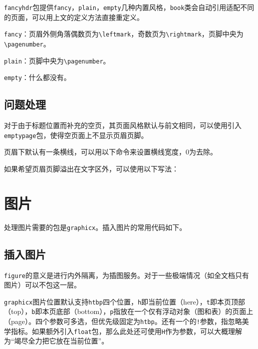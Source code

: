 \documentclass[10pt,openany]{book}
\begin{document}
\texttt{fancyhdr}包提供\texttt{fancy}，\texttt{plain}，\texttt{empty}几种内置风格，\texttt{book}类会自动引用适配不同的页面，可以用上文的定义方法直接重定义。

\texttt{fancy}：页眉外侧角落偶数页为\texttt{\textbackslash{}leftmark}，奇数页为\texttt{\textbackslash{}rightmark}，页脚中央为\texttt{\textbackslash{}pagenumber}。

\texttt{plain}：页脚中央为\texttt{\textbackslash{}pagenumber}。

\texttt{empty}：什么都没有。

\section{问题处理}

对于由于标题位置而补充的空页，其页面风格默认与前文相同，可以使用引入\texttt{emptypage}包，使得空页面上不显示页眉页脚。

页眉下默认有一条横线，可以用以下命令来设置横线宽度，0为去除。



如果希望页眉页脚溢出在文字区外，可以使用以下写法：



\chapter{图片}

处理图片需要的包是\texttt{graphicx}。插入图片的常用代码如下。

\section{插入图片}



\texttt{figure}的意义是进行内外隔离，为插图服务。对于一些极端情况（如全文档只有图片）可以不包这一层。

\texttt{graphicx}图片位置默认支持\texttt{htbp}四个位置，\texttt{h}即当前位置（here），\texttt{t}即本页顶部（top），\texttt{b}即本页底部（bottom），\texttt{p}指放在一个仅有浮动对象（图和表）的页面上（page）。四个参数可多选，但优先级固定为\texttt{htbp}。还有一个的\texttt{!}参数，指忽略美学指标。如果额外引入\texttt{float}包，那么此处还可使用\texttt{H}作为参数，可以大概理解为“竭尽全力把它放在当前位置”。
\end{document}
